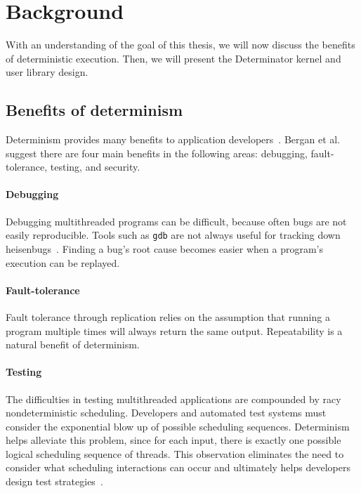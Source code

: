 
\section{Background}
\label{sec:bg}

With an understanding of the goal of this thesis, we will now discuss the
benefits of deterministic execution. Then, we will present the Determinator
kernel and user library design.

\subsection{Benefits of determinism}
\label{sec:det-motiv}

Determinism provides many benefits to application
developers~\cite{Bergan11,olszewski2009kendo,bocchino2009parallel}. Bergan et
al. suggest there are four main benefits in
the following areas: debugging, fault-tolerance, testing, and security.

\paragraph{Debugging} Debugging multithreaded programs can be difficult, because
often bugs are not easily reproducible. Tools such as {\tt gdb} are not
always useful for tracking down heisenbugs~\cite{Musuvathi08}. Finding a bug's
root cause becomes easier when a program's execution can be replayed.

\paragraph{Fault-tolerance} Fault tolerance through replication relies
on the assumption that running a program multiple times will always return the
same output. Repeatability is a natural benefit of determinism.

\paragraph{Testing} The difficulties in testing multithreaded applications are
compounded by racy nondeterministic scheduling. Developers and automated test
systems must consider the exponential blow up of possible scheduling sequences.
Determinism helps alleviate this problem, since for each input, there is exactly
one possible logical scheduling sequence of threads. This observation eliminates
the need to consider what scheduling interactions can occur and ultimately
helps developers design test strategies~\cite{Bergan11}.

